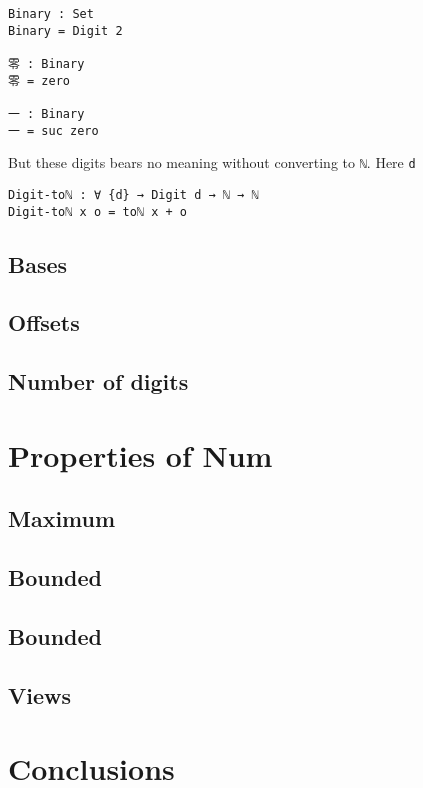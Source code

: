 \documentclass[14pt, a4paper]{article}
\begin{document}
\begin{lstlisting}
Binary : Set
Binary = Digit 2

零 : Binary
零 = zero

一 : Binary
一 = suc zero
\end{lstlisting}

But these digits bears no meaning without converting to {\lstinline|ℕ|}.
Here {\lstinline|d|}

\begin{lstlisting}
Digit-toℕ : ∀ {d} → Digit d → ℕ → ℕ
Digit-toℕ x o = toℕ x + o
\end{lstlisting}


%





\subsection{Bases}
\subsection{Offsets}
\subsection{Number of digits}

\section{Properties of Num}
\subsection{Maximum}
\subsection{Bounded}
\subsection{Bounded}
\subsection{Views}

\section{Conclusions}\label{conclusions}



\end{document}
